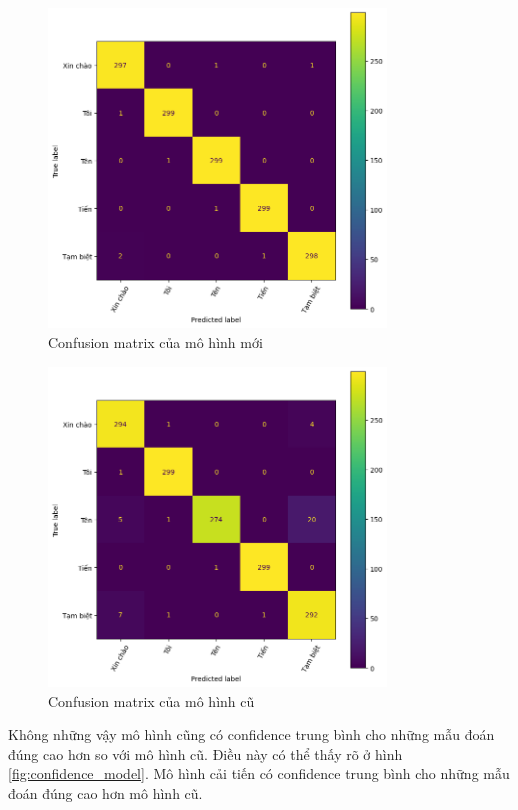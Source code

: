 \begin{figure}[H]
    \centering
    \includegraphics[width=0.8\textwidth]{Images/Improvement results/new_confusion_matrix.png}
    \caption{Confusion matrix của mô hình mới}
    \label{fig:confusion_matrix_new}
\end{figure}

\begin{figure}[H]
    \centering
    \includegraphics[width=0.8\textwidth]{Images/Improvement results/old_confusion_matrix.png}
    \caption{Confusion matrix của mô hình cũ}
    \label{fig:confusion_matrix_old}
\end{figure}

Không những vậy mô hình cũng có confidence trung bình cho những mẫu đoán đúng cao hơn so với mô hình cũ. Điều này có thể thấy rõ ở hình \ref{fig:confidence_model}. Mô hình cải tiến có confidence trung bình cho những mẫu đoán đúng cao hơn mô hình cũ. 

